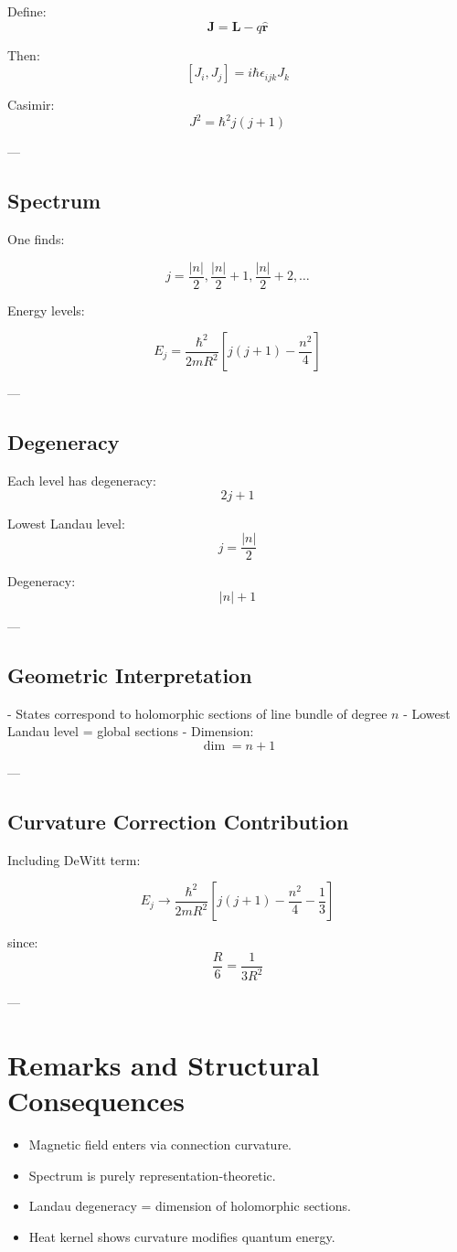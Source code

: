 Define:
\[
\bm{J} = \bm{L} - q \hat{\bm{r}}
\]

Then:
\[
[J_i,J_j] = i\hbar \epsilon_{ijk} J_k
\]

Casimir:
\[
J^2 = \hbar^2 j(j+1)
\]

---

\subsection{Spectrum}

One finds:

\[
j = \frac{|n|}{2}, \frac{|n|}{2}+1, \frac{|n|}{2}+2, \dots
\]

Energy levels:

\[
\boxed{
E_j =
\frac{\hbar^2}{2mR^2}
\left[
j(j+1) - \frac{n^2}{4}
\right]
}
\]

---

\subsection{Degeneracy}

Each level has degeneracy:
\[
2j+1
\]

Lowest Landau level:
\[
j = \frac{|n|}{2}
\]

Degeneracy:
\[
|n|+1
\]

---

\subsection{Geometric Interpretation}

- States correspond to holomorphic sections of line bundle of degree $n$
- Lowest Landau level = global sections
- Dimension:
\[
\dim = n+1
\]

---

\subsection{Curvature Correction Contribution}

Including DeWitt term:

\[
E_j \to
\frac{\hbar^2}{2mR^2}
\left[
j(j+1) - \frac{n^2}{4} - \frac{1}{3}
\right]
\]

since:
\[
\frac{R}{6} = \frac{1}{3R^2}
\]

---

\section{Remarks and Structural Consequences}

\begin{itemize}
\item Magnetic field enters via connection curvature.
\item Spectrum is purely representation-theoretic.
\item Landau degeneracy = dimension of holomorphic sections.
\item Heat kernel shows curvature modifies quantum energy.
\end{itemize}
